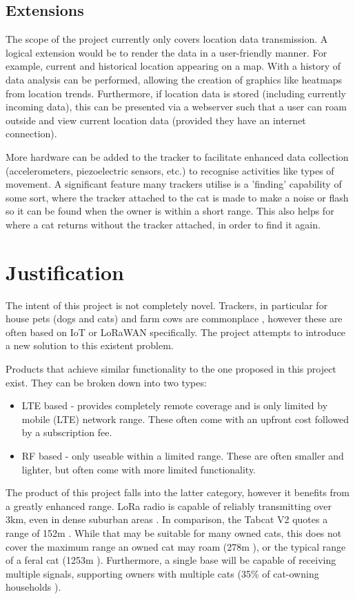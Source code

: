 \documentclass[11pt]{article}
\begin{document}
\subsection{Extensions}
The scope of the project currently only covers location data transmission.
A logical extension would be to render the data in a user-friendly manner.
For example, current and historical location appearing on a map.
With a history of data analysis can be performed, allowing the creation of graphics like heatmaps from location trends. 
Furthermore, if location data is stored (including currently incoming data), 
this can be presented via a webserver such that a user can roam outside and view current location data 
(provided they have an internet connection).

More hardware can be added to the tracker to facilitate enhanced data collection
(accelerometers, piezoelectric sensors, etc.) to recognise activities like types of movement.
A significant feature many trackers utilise is a 'finding' capability of some sort, where the tracker attached to the cat is made to make a noise or flash so it can be found when the owner is within a short range.
This also helps for where a cat returns without the tracker attached, in order to find it again.


\section{Justification}
The intent of this project is not completely novel. Trackers, in particular for house pets (dogs and cats) and farm cows are commonplace \cite{davcev:lorawan,sivarman:tracker}, 
however these are often based on IoT or LoRaWAN specifically.
The project attempts to introduce a new solution to this existent problem.

Products that achieve similar functionality to the one proposed in this project exist. They can be broken down into two types: 
\begin{itemize}
    \item LTE based - provides completely remote coverage and is only limited by mobile (LTE) network range. These often come with an upfront cost followed by a subscription fee.
    \item RF based - only useable within a limited range. These are often smaller and lighter, but often come with more limited functionality. 
\end{itemize}
The product of this project falls into the latter category, however it benefits from a greatly enhanced range.
LoRa radio is capable of reliably transmitting over 3km, even in dense suburban areas \cite{augustin:lora}.
In comparison, the Tabcat V2 quotes a range of 152m \cite{tabcat:tracker}. 
While that may be suitable for many owned cats, this does not cover the maximum range an owned cat may roam (278m \cite{hammer:urbanisaton}),
or the typical range of a feral cat (1253m \cite{horn:range}).
Furthermore, a single base will be capable of receiving multiple signals, supporting owners with multiple cats (35\% of cat-owning households \cite{catsprotection:catsreport}).
\end{document}

